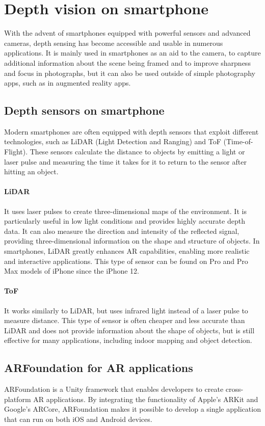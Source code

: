 \section{Depth vision on smartphone}\label{sec:depth-vision-on-smartphone}
With the advent of smartphones equipped with powerful sensors and advanced cameras,
depth sensing has become accessible and usable in numerous applications.
It is mainly used in smartphones as an aid to the camera, to capture additional
information about the scene being framed and to improve sharpness and focus in photographs,
but it can also be used outside of simple photography apps, such as in augmented reality apps.

\subsection{Depth sensors on smartphone}\label{subsec:depth-sensors-on-smartphone}
Modern smartphones are often equipped with depth sensors that exploit different technologies,
such as LiDAR (Light Detection and Ranging) and ToF (Time-of-Flight).
These sensors calculate the distance to objects by emitting a light or laser pulse and measuring the
time it takes for it to return to the sensor after hitting an object.

\paragraph{LiDAR}
It uses laser pulses to create three-dimensional maps of the environment.
It is particularly useful in low light conditions and provides highly accurate depth data.
It can also measure the direction and intensity of the reflected signal,
providing three-dimensional information on the shape and structure of objects.
In smartphones, LiDAR greatly enhances AR capabilities, enabling more realistic and interactive applications.
This type of sensor can be found on Pro and Pro Max models of iPhone since the iPhone 12.

\paragraph{ToF}
It works similarly to LiDAR, but uses infrared light instead of a laser pulse to measure distance.
This type of sensor is often cheaper and less accurate
than LiDAR and does not provide information about the shape of objects,
but is still effective for many applications, including indoor mapping and object detection.

\subsection{ARFoundation for AR applications}\label{subsec:arfoundation-for-ar-applications}
ARFoundation is a Unity framework that enables developers to create cross-platform AR applications.
By integrating the functionality of Apple's ARKit and Google's ARCore, ARFoundation makes it possible
to develop a single application that can run on both iOS and Android devices.

